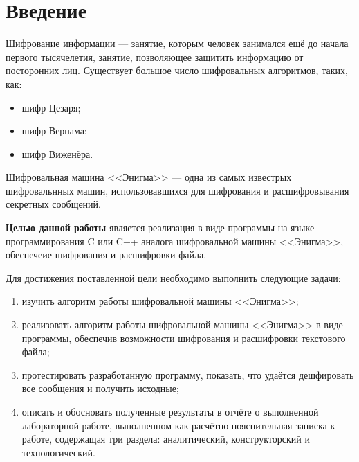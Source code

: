 \chapter*{Введение}

Шифрование информации --- занятие, которым человек занимался ещё до начала первого тысячелетия, занятие, позволяющее защитить информацию от посторонних лиц. 
Существует большое число шифровальных алгоритмов, таких, как:
\begin{itemize}[label=---]
    \item шифр Цезаря;
    \item шифр Вернама;
    \item шифр Виженёра.
\end{itemize}


Шифровальная машина <<Энигма>> --- одна из самых известрых шифровальнных машин, использовавшихся для шифрования и расшифровывания секретных сообщений.

\textbf{Целью данной работы} является реализация в виде программы на языке программирования C или C++ аналога шифровальной машины <<Энигма>>, обеспечеие шифрования и расшифровки файла. 

Для достижения поставленной цели необходимо выполнить следующие задачи:
\begin{enumerate}[label=\arabic*)]
	\item изучить алгоритм работы шифровальной машины <<Энигма>>;
    \item реализовать алгоритм работы шифровальной машины <<Энигма>> в виде программы, обеспечив возможности шифрования и расшифровки текстового файла;
	\item протестировать разработанную программу, показать, что удаётся дешфировать все сообщения и получить исходные;
	\item описать и обосновать полученные результаты в отчёте о выполненной лабораторной работе, выполненном как расчётно-пояснительная записка к работе, содержащая три раздела: аналитический, конструкторский и технологический.
\end{enumerate}
